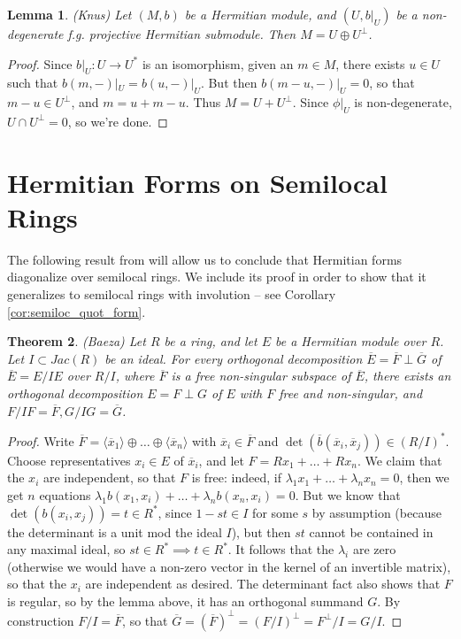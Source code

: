 \documentclass[edeposit,fullpage]{uiucthesis2009}
\theoremstyle{plain}
\newtheorem{lemma}{Lemma}
\numberwithin{lemma}{section}
\newtheorem{theorem}[lemma]{Theorem}
\theoremstyle{definition}
\begin{document}
\begin{lemma} (Knus)
Let $(M,b)$ be a Hermitian module, and $(U,b|_U)$ be a non-degenerate
f.g. projective Hermitian submodule. Then $M = U \oplus U^\perp$.
\end{lemma}

\begin{proof}
Since $b|_U : U \rightarrow U^*$ is an isomorphism, given an $m \in
M$, there exists $u \in U$ such that $b(m,-)|_U = b(u,-)|_U$. But then
$b(m-u,-)|_U = 0$, so that $m-u \in U^\perp$, and $m = u + m-u$. Thus
$M = U + U^\perp$. Since $\phi|_U$ is non-degenerate, $U \cap U^\perp
= 0$, so we're done. 
\end{proof}

\section{Hermitian Forms on Semilocal Rings}\label{sec:herm_form_semiloc}

The following result from \cite{Baeza} will allow us to conclude that
Hermitian forms diagonalize over semilocal rings. We include its proof
in order to show that it generalizes to semilocal rings with
involution -- see Corollary \ref{cor:semiloc_quot_form}.

\begin{theorem}(Baeza)
Let $R$ be a ring, and let $E$ be a Hermitian module over
$R$. Let $I \subset Jac(R)$ be an ideal. For every orthogonal decomposition $\overline E = \overline F
\perp \overline G$ of $\overline E = E/IE$ over $R/I$, where $\overline
F$ is a free non-singular subspace of $\overline E$, there exists an
orthogonal decomposition $E = F \perp G$ of $E$ with $F$ free and
non-singular, and $F/IF = \overline F, G/IG = \overline G$.
\end{theorem}

\begin{proof}
Write $\overline F = \langle \overline x_1 \rangle \oplus \dots \oplus
\langle \overline x_n \rangle$ with $\overline x_i \in \overline F$
and $\det(\overline b(\overline x_i,\overline x_j)) \in (R/I)^*$. Choose
representatives $x_i \in E$ of $\overline x_i$, and let $F = Rx_1 +
\dots + Rx_n$. We claim that the $x_i$ are independent, so that $F$ is
free: indeed, if $\lambda_1x_1 + \dots + \lambda_nx_n = 0$, then we
get $n$ equations $\lambda_1b(x_1,x_i) + \dots + \lambda_nb(x_n,x_i) =
0$. But we know that $\det(b(x_i,x_j)) = t\in R^*$, since $1-st \in I$
for some $s$ by assumption (because the determinant is a unit mod the
ideal $I$), but then $st$ cannot be contained in any
maximal ideal, so $st \in R^*
\implies t \in R^*$. It follows that the $\lambda_i$ are zero
(otherwise we would have a non-zero vector in the kernel of an
invertible matrix), so that
the $x_i$ are independent as desired. The determinant fact also shows
that $F$ is regular, so by the lemma above, it has an orthogonal
summand $G$. By construction $F/I = \overline F$, so that $\overline G
= (\overline
F)^{\perp} = (F/I)^{\perp} = F^{\perp}/I = G/I$.
\end{proof}
\end{document}
